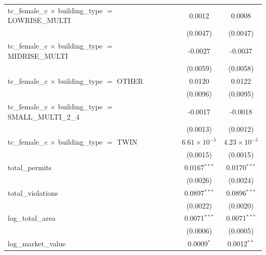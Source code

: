 \begin{tabular}{lcc}
   tc\_female\_c $\times$ building\_type $=$ LOWRISE\_MULTI            & 0.0012                 & 0.0008\\   
                                                                       & (0.0047)               & (0.0047)\\   
   tc\_female\_c $\times$ building\_type $=$ MIDRISE\_MULTI            & -0.0027                & -0.0037\\   
                                                                       & (0.0059)               & (0.0058)\\   
   tc\_female\_c $\times$ building\_type $=$ OTHER                     & 0.0120                 & 0.0122\\   
                                                                       & (0.0096)               & (0.0095)\\   
   tc\_female\_c $\times$ building\_type $=$ SMALL\_MULTI\_2\_4        & -0.0017                & -0.0018\\   
                                                                       & (0.0013)               & (0.0012)\\   
   tc\_female\_c $\times$ building\_type $=$ TWIN                      & $6.61\times 10^{-5}$   & $4.23\times 10^{-5}$\\    
                                                                       & (0.0015)               & (0.0015)\\   
   total\_permits                                                      & 0.0167$^{***}$         & 0.0170$^{***}$\\   
                                                                       & (0.0026)               & (0.0024)\\   
   total\_violations                                                   & 0.0897$^{***}$         & 0.0896$^{***}$\\   
                                                                       & (0.0022)               & (0.0020)\\   
   log\_total\_area                                                    & 0.0071$^{***}$         & 0.0071$^{***}$\\   
                                                                       & (0.0006)               & (0.0005)\\   
   log\_market\_value                                                  & 0.0009$^{*}$           & 0.0012$^{**}$\\   

\end{tabular}
